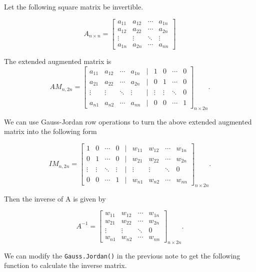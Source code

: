 \documentclass[
]{book}
\begin{document}
Let the following square matrix be invertible.

\[
A_{n\times n} = \left[\begin{array}{cccc} 
a_{11} & a_{12} & \cdots & a_{1n}  \\ 
a_{12} & a_{22} & \cdots & a_{2n}  \\ 
\vdots & \vdots & \ddots & \vdots  \\
a_{1n} & a_{2n} & \cdots & a_{nn}  
\end{array}
\right]
\]

The extended augmented matrix is
\[
AM_{n,2n} = \left[\begin{array}{cccccccccc} 
a_{11} & a_{12} & \cdots & a_{1n} & \text{|} & 1 & 0 & \cdots & 0 \\ 
a_{21} & a_{22} & \cdots & a_{2n}  & \text{|} & 0 & 1 & \cdots & 0 \\ 
\vdots & \vdots & \ddots & \vdots & \text{|} & \vdots & \vdots & \ddots & 0 \\
a_{n1} & a_{n2} & \cdots & a_{nn}  & \text{|} & 0 & 0 & \cdots & 1 
\end{array}
\right]_{n\times 2n}.
\]

We can use Gauss-Jordan row operations to turn the above extended augmented matrix into the following form

\[
IM_{n,2n} = \left[\begin{array}{ccccccccc} 
 1 & 0 & \cdots & 0& \text{|} & w_{11} & w_{12} & \cdots & w_{1n} \\ 
0 & 1 & \cdots & 0 & \text{|} & w_{21} & w_{22} & \cdots & w_{2n}  \\ 
\vdots & \vdots & \ddots & \vdots & \text{|} & \vdots & \vdots & \ddots & 0 \\
0 & 0 & \cdots & 1  & \text{|} &  w_{n1} & w_{n2} & \cdots & w_{nn}
\end{array}
\right]_{n\times 2n}.
\]

Then the inverse of A is given by

\[
A^{-1} = \left[\begin{array}{ccccc} 
w_{11} & w_{12} & \cdots & w_{1n} \\ 
w_{21} & w_{22} & \cdots & w_{2n}  \\ 
\vdots & \vdots & \ddots & 0 \\
w_{n1} & w_{n2} & \cdots & w_{nn}
\end{array}
\right]_{n\times 2n}.
\]

We can modify the \texttt{Gauss.Jordan()} in the previous note to get the following function to calculate the inverse matrix.
\end{document}
